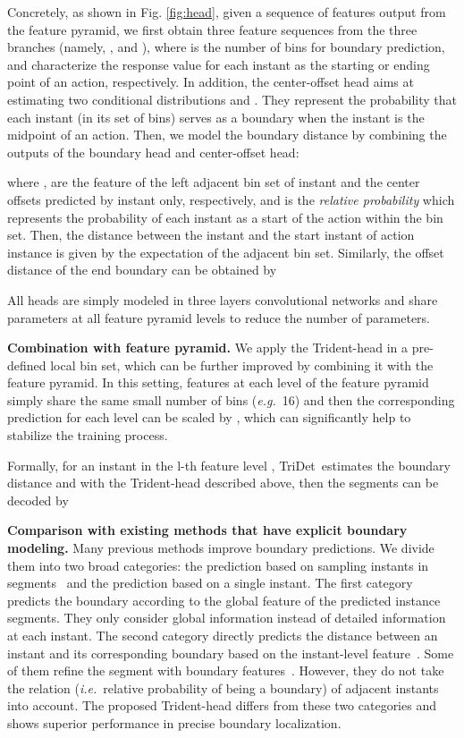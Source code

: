 \documentclass[10pt,twocolumn,letterpaper]{article}
\def\ie{{\em i.e.}}
\def\eg{{\em e.g.}}
\newcommand{\figref}[1]{Fig. \ref{#1}}
\newcommand{\myPara}[1]{\vspace{.05in}\noindent\textbf{#1}}
\def\name{TriDet}
\begin{document}
Concretely, as shown in \figref{fig:head}, given a sequence of features  output from the feature pyramid, we first obtain three feature sequences from the three branches (namely, ,  and ), where  is the number of bins for boundary prediction,  and  characterize the response value for each instant as the starting or ending point of an action, respectively. In addition, the center-offset head aims at estimating two conditional distributions  and . They represent the probability that each instant (in its set of bins) serves as a boundary when the instant  is the midpoint of an action. Then, we model the boundary distance by combining the outputs of the boundary head and center-offset head: 

where ,  are the feature of the left adjacent bin set of instant  and the center offsets predicted by instant  only, respectively, and  is the \emph{relative probability} which represents the probability of each instant as a start of the action within the bin set. Then, the distance between the instant  and the start instant of action instance  is given by the expectation of the adjacent bin set. Similarly, the offset distance of the end boundary  can be obtained by


All heads are simply modeled in three layers convolutional networks and share parameters at all feature pyramid levels to reduce the number of parameters.

\myPara{Combination with feature pyramid.} 
We apply the Trident-head in a pre-defined local bin set, which can be further improved by combining it with the feature pyramid.
In this setting, features at each level of the feature pyramid simply share the same small number of bins  (\eg~16) and then the corresponding prediction for each level  can be scaled by , which can significantly help to stabilize the training process. 

Formally, for an instant in the l-th feature level ,  \name~estimates the boundary distance  and  with the Trident-head described above, then the segments  can be decoded by 



\myPara{Comparison with existing methods that have explicit boundary modeling.} Many previous methods improve boundary predictions. We divide them into two broad categories: the prediction based on sampling instants in segments~\cite{lin2019bmn,liu2022end,shi2022react} and the prediction based on a single instant. The first category predicts the boundary 
according to the global feature of the predicted instance segments.
They only consider global information instead of detailed information at each instant. The second category directly predicts the distance between an instant and its corresponding boundary based on the instant-level feature~\cite{lin2021learning,zhang2022actionformer,zhao2021video,qing2021temporal}. Some of them refine the segment with boundary features~\cite{lin2021learning,qing2021temporal,zhao2021video}. 
However, they do not take the relation (\ie~relative probability of being a boundary) of adjacent instants into account.
The proposed Trident-head differs from these two categories and shows superior performance in precise boundary localization.
\end{document}
